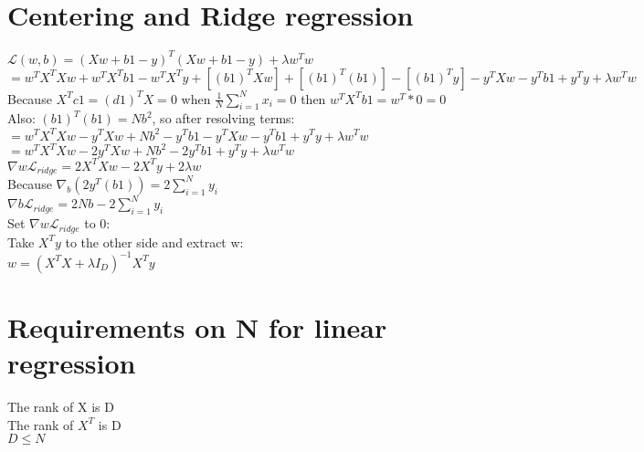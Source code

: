 \section{Centering and Ridge regression}
$\mathcal{L}(w,b)=(Xw +b1-y)^{T}(Xw +b1-y)+\lambda w^{T}w$\\ $=w^{T}X^{T}Xw+w^{T}
X^{T}b1-w^{T}X^{T}y +[(b1)^{T}Xw]+[(b1)^{T}(b1)]-[(b1)^{T}y]-y^{T}Xw-y^{T}b1+y^{T}
y+\lambda w^{T}w$\\ Because $X^{T}c1=(d1)^{T}X=0$ when
$\frac{1}{N}\sum_{i=1}^{N}x_{i}= 0$ then $w^{T}X^{T}b1=w^{T}*0=0$\\ Also:
$(b1)^{T}(b1) = Nb^{2}$, so after resolving terms:\\ $=w^{T}X^{T}Xw-y^{T}Xw +Nb^{2}
-y^{T}b1-y^{T}Xw-y^{T}b1 +y^{T}y +\lambda w^{T}w$\\
$=w^{T}X^{T}Xw-2y^{T}Xw +Nb^{2}-2y^{T}b1+y^{T}y +\lambda w^{T}w$\\ $\nabla{w}\mathcal{L}
_{ridge}=2X^{T}Xw-2X^{T}y+2\lambda w$\\ Because
$\nabla_{b}(2y^{T}(b1))=2\sum_{i=1}^{N}y_{i}$\\ $\nabla{b}\mathcal{L}_{ridge}=2N
b-2\sum_{i=1}^{N}y_{i}$\\ Set $\nabla{w}\mathcal{L}_{ridge}$ to 0:\\ Take
$X^{T}y$ to the other side and extract w:\\
$w=(X^{T}X+\lambda I_{D})^{-1}X^{T}y$\\
\section{Requirements on N for linear regression}
The rank of X is D\\ The rank of $X^{T}$ is D\\ $D \leq N$\\